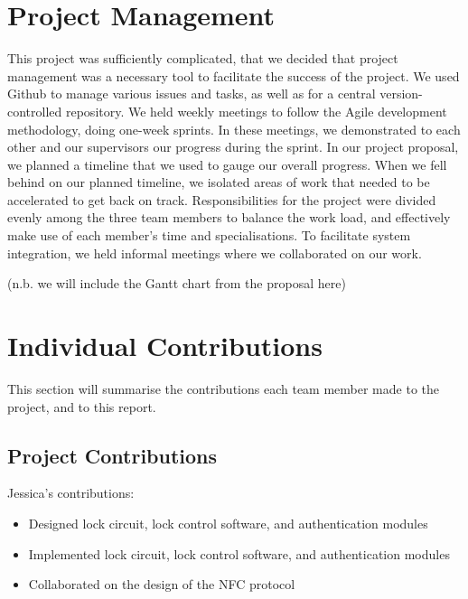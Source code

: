 \documentclass[12pt]{report}
\let\Oldsection\section
\renewcommand{\section}{\FloatBarrier\Oldsection}
\let\Oldsubsection\subsection
\renewcommand{\subsection}{\FloatBarrier\Oldsubsection}
\begin{document}

\section{Project Management} \label{project-management}

This project was sufficiently complicated, that we decided that project management was a necessary tool to facilitate 
the success of the project. We used Github to manage various issues and tasks, as well as for a central 
version-controlled repository. We held weekly meetings to follow the Agile development methodology, doing one-week 
sprints. In these meetings, we demonstrated to each other and our supervisors our progress during the sprint. In our 
project proposal, we planned a timeline that we used to gauge our overall progress. When we fell behind on our planned 
timeline, we isolated areas of work that needed to be accelerated to get back on track. Responsibilities for the 
project were divided evenly among the three team members to balance the work load, and effectively make use of each 
member's time and specialisations. To facilitate system integration, we held informal meetings where we collaborated on 
our work.

(n.b. we will include the Gantt chart from the proposal here)


\section{Individual Contributions} \label{individual-contributions}

This section will summarise the contributions each team member made to the project, and to this report.


\subsection{Project Contributions} \label{project-contributions}

Jessica's contributions:
\begin{itemize}
\item Designed lock circuit, lock control software, and authentication modules
\item Implemented lock circuit, lock control software, and authentication modules
\item Collaborated on the design of the NFC protocol
\end{itemize}
\end{document}
